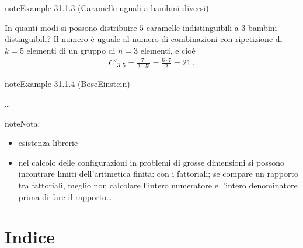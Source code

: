 \documentclass[letterpaper,10pt,italian]{jupyterBook}
\begin{document}
\label{ch/statistics/combinatorics:ex-combinations-with-rep-3}
\begin{sphinxadmonition}{note}{Example 31.1.3 (Caramelle uguali a bambini diversi)}



\sphinxAtStartPar
In quanti modi si possono distribuire \(5\) caramelle indistinguibili a \(3\) bambini distinguibili? Il numero è uguale al numero di combinazioni con ripetizione di \(k=5\) elementi di un gruppo di \(n=3\) elementi, e cioè
\begin{equation*}
\begin{split}C'_{3,5} = \frac{7!}{2! \cdot 5!} = \frac{6 \cdot 7}{2} = 21 \ .\end{split}
\end{equation*}\end{sphinxadmonition}
\label{ch/statistics/combinatorics:ex-combinations-with-rep-bose-einstein}
\begin{sphinxadmonition}{note}{Example 31.1.4 (Bose\sphinxhyphen{}Einstein)}



\sphinxAtStartPar
…
\end{sphinxadmonition}

\begin{sphinxadmonition}{note}{Nota:}\begin{itemize}
\item {} 
\sphinxAtStartPar
esistenza librerie

\item {} 
\sphinxAtStartPar
nel calcolo delle configurazioni in problemi di grosse dimensioni si possono incontrare limiti dell’aritmetica finita:  con i fattoriali; se compare un rapporto tra fattoriali, meglio non calcolare l’intero numeratore e l’intero denominatore prima di fare il rapporto…

\end{itemize}
\end{sphinxadmonition}

\sphinxstepscope


\part{Indice}

\sphinxstepscope
\end{document}
